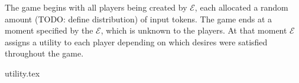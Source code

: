   The game begins with all players being created by $\mathcal{E}$, each allocated a random
  amount (TODO: define distribution) of input tokens. The game ends at a moment specified
  by the $\mathcal{E}$, which is unknown to the players. At that moment $\mathcal{E}$
  assigns a utility to each player depending on which desires were satisfied throughout
  the game.

  {utility.tex}
